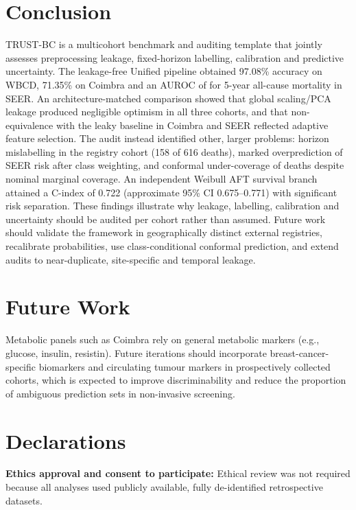 \documentclass[11pt,a4paper]{article}
\begin{document}
\section{Conclusion}\label{sec:conclusion}
TRUST-BC is a multicohort benchmark and auditing template that jointly assesses preprocessing leakage, fixed-horizon labelling, calibration and predictive uncertainty. The leakage-free Unified pipeline obtained 97.08\% accuracy on WBCD, 71.35\% on Coimbra and an AUROC of \seerUniAUC{} for 5-year all-cause mortality in SEER. An architecture-matched comparison showed that global scaling/PCA leakage produced negligible optimism in all three cohorts, and that non-equivalence with the leaky baseline in Coimbra and SEER reflected adaptive feature selection. The audit instead identified other, larger problems: horizon mislabelling in the registry cohort (158 of 616 deaths), marked overprediction of SEER risk after class weighting, and conformal under-coverage of deaths despite nominal marginal coverage. An independent Weibull AFT survival branch attained a C-index of 0.722 (approximate 95\% CI 0.675--0.771) with significant risk separation. These findings illustrate why leakage, labelling, calibration and uncertainty should be audited per cohort rather than assumed. Future work should validate the framework in geographically distinct external registries, recalibrate probabilities, use class-conditional conformal prediction, and extend audits to near-duplicate, site-specific and temporal leakage.

\section{Future Work}\label{sec:future-work}
Metabolic panels such as Coimbra rely on general metabolic markers (e.g., glucose, insulin, resistin). Future iterations should incorporate breast-cancer-specific biomarkers and circulating tumour markers in prospectively collected cohorts, which is expected to improve discriminability and reduce the proportion of ambiguous prediction sets in non-invasive screening.

\section*{Declarations}\label{sec:declarations}
\small
\noindent\textbf{Ethics approval and consent to participate:} Ethical review was not required because all analyses used publicly available, fully de-identified retrospective datasets.
\end{document}
